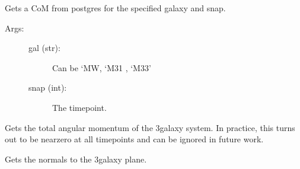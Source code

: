 \documentclass[letterpaper,10pt,english]{sphinxmanual}
\begin{document}
\begin{fulllineitems}

\begin{fulllineitems}
\label{\detokenize{timecourse:galaxy.timecourse.TimeCourse.get_one_com}}
Gets a CoM from postgres for the specified galaxy and snap.
\begin{description}
\item[{Args:}] \leavevmode\begin{description}
\item[{gal (str): }] \leavevmode
Can be ‘MW, ‘M31 , ‘M33’

\item[{snap (int):}] \leavevmode
The timepoint.

\end{description}

\end{description}

\end{fulllineitems}


\begin{fulllineitems}
\label{\detokenize{timecourse:galaxy.timecourse.TimeCourse.read_total_angmom_db}}
Gets the total angular momentum of the 3\sphinxhyphen{}galaxy system. In practice, 
this turns out to be near\sphinxhyphen{}zero at all timepoints and can be ignored
in future work.

\end{fulllineitems}


\begin{fulllineitems}
\label{\detokenize{timecourse:galaxy.timecourse.TimeCourse.read_normals_db}}
Gets the normals to the 3\sphinxhyphen{}galaxy plane.

\end{fulllineitems}


\end{fulllineitems}
\end{document}

